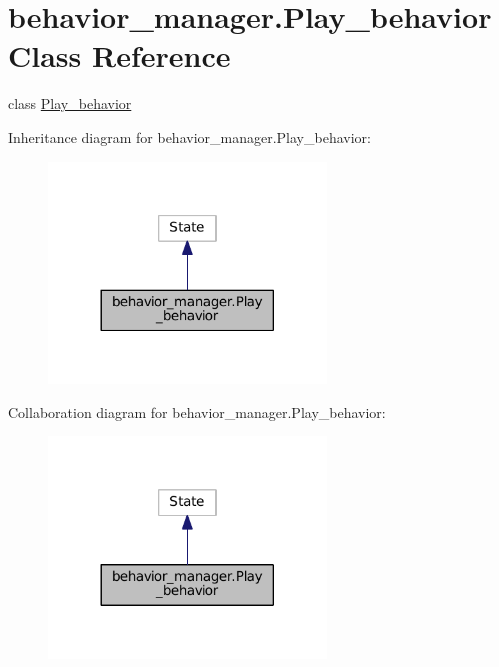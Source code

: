 \hypertarget{classbehavior__manager_1_1Play__behavior}{}\section{behavior\+\_\+manager.\+Play\+\_\+behavior Class Reference}
\label{classbehavior__manager_1_1Play__behavior}


class \hyperlink{classbehavior__manager_1_1Play__behavior}{Play\+\_\+behavior}  




Inheritance diagram for behavior\+\_\+manager.\+Play\+\_\+behavior\+:
\nopagebreak
\begin{figure}[H]
\begin{center}
\leavevmode
\includegraphics[width=209pt]{classbehavior__manager_1_1Play__behavior__inherit__graph}
\end{center}
\end{figure}


Collaboration diagram for behavior\+\_\+manager.\+Play\+\_\+behavior\+:
\nopagebreak
\begin{figure}[H]
\begin{center}
\leavevmode
\includegraphics[width=209pt]{classbehavior__manager_1_1Play__behavior__coll__graph}
\end{center}
\end{figure}
